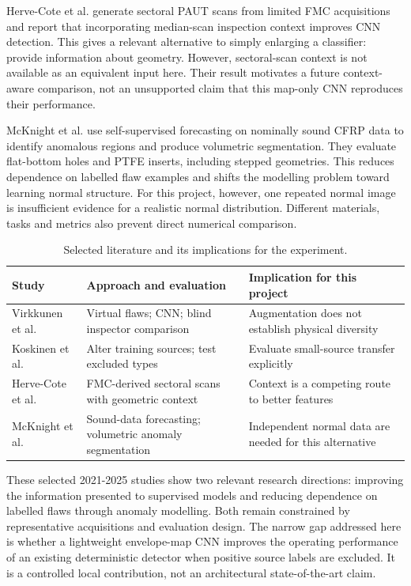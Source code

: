 \documentclass[11pt,a4paper]{article}
\begin{document}
Herve-Cote et al. \cite{ref5} generate sectoral PAUT scans from limited FMC acquisitions and report that incorporating median-scan inspection context improves CNN detection. This gives a relevant alternative to simply enlarging a classifier: provide information about geometry. However, sectoral-scan context is not available as an equivalent input here. Their result motivates a future context-aware comparison, not an unsupported claim that this map-only CNN reproduces their performance.

McKnight et al. \cite{ref6} use self-supervised forecasting on nominally sound CFRP data to identify anomalous regions and produce volumetric segmentation. They evaluate flat-bottom holes and PTFE inserts, including stepped geometries. This reduces dependence on labelled flaw examples and shifts the modelling problem toward learning normal structure. For this project, however, one repeated normal image is insufficient evidence for a realistic normal distribution. Different materials, tasks and metrics also prevent direct numerical comparison.

\begin{table}[H]
\centering
\caption{Selected literature and its implications for the experiment.}
\label{tab:1}
\small
\setlength{\tabcolsep}{4pt}
\begin{tabularx}{\linewidth}{@{}YYY@{}}
\toprule
{}
\textbf{Study} & \textbf{Approach and evaluation} & \textbf{Implication for this project} \\
\midrule
Virkkunen et al. \cite{ref1} & Virtual flaws; CNN; blind inspector comparison & Augmentation does not establish physical diversity \\
Koskinen et al. \cite{ref2} & Alter training sources; test excluded types & Evaluate small-source transfer explicitly \\
Herve-Cote et al. \cite{ref5} & FMC-derived sectoral scans with geometric context & Context is a competing route to better features \\
McKnight et al. \cite{ref6} & Sound-data forecasting; volumetric anomaly segmentation & Independent normal data are needed for this alternative \\
\bottomrule
\end{tabularx}
\end{table}

These selected 2021-2025 studies show two relevant research directions: improving the information presented to supervised models and reducing dependence on labelled flaws through anomaly modelling. Both remain constrained by representative acquisitions and evaluation design. The narrow gap addressed here is whether a lightweight envelope-map CNN improves the operating performance of an existing deterministic detector when positive source labels are excluded. It is a controlled local contribution, not an architectural state-of-the-art claim.
\end{document}
